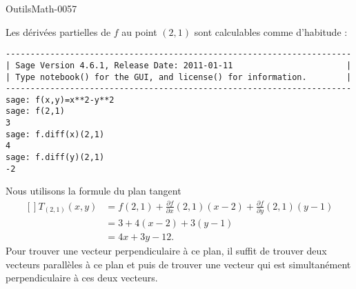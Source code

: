 
\begin{corrige}{OutilsMath-0057}

    Les dérivées partielles de $f$ au point $(2,1)$ sont calculables comme d'habitude :
    \begin{verbatim}
----------------------------------------------------------------------
| Sage Version 4.6.1, Release Date: 2011-01-11                       |
| Type notebook() for the GUI, and license() for information.        |
----------------------------------------------------------------------
sage: f(x,y)=x**2-y**2
sage: f(2,1)
3
sage: f.diff(x)(2,1)
4
sage: f.diff(y)(2,1)
-2

    \end{verbatim}
    Nous utilisons la formule du plan tangent
    \begin{equation}
        \begin{aligned}[]
            T_{(2,1)}(x,y)&=f(2,1)+\frac{ \partial f }{ \partial x }(2,1)(x-2)+\frac{ \partial f }{ \partial y }(2,1)(y-1)\\
                &=3+4(x-2)+3(y-1)\\
                &=4x+3y-12.
        \end{aligned}
    \end{equation}
    Pour trouver une vecteur perpendiculaire à ce plan, il suffit de trouver deux vecteurs parallèles à ce plan et puis de trouver une vecteur qui est simultanément perpendiculaire à ces deux vecteurs.


\end{corrige}
